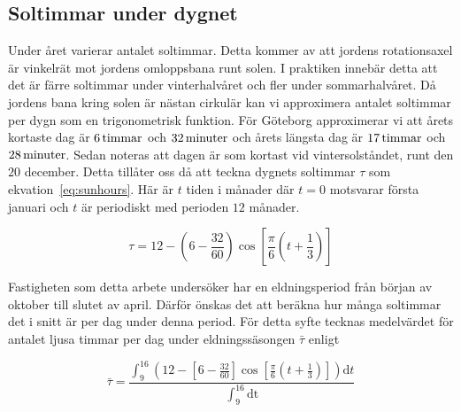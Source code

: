 \subsection{Soltimmar under dygnet}
\label{subsec:sunhours}
Under året varierar antalet soltimmar. Detta kommer av att jordens rotationsaxel är vinkelrät 
mot jordens omloppsbana runt solen. I praktiken innebär detta att det är färre soltimmar
under vinterhalvåret och fler under sommarhalvåret. Då jordens bana kring solen är nästan
cirkulär kan vi approximera antalet soltimmar per dygn som en trigonometrisk funktion.
För Göteborg approximerar vi att årets kortaste dag är $\unit[6]{ timmar}$ och $\unit[32]{minuter}$ och årets längsta
dag är $\unit[17]{ timmar}$ och $\unit[28]{ minuter}$\cite{sunup}. Sedan noteras att dagen är som kortast vid vintersolståndet, runt den $20$
december.
Detta tillåter oss då att teckna dygnets soltimmar $\tau$ som ekvation~\eqref{eq:sunhours}. Här
är $t$ tiden i månader där $t=0$ motsvarar första januari och $t$ är periodiskt med perioden $12$ månader.

\begin{equation}
\label{eq:sunhours}
\tau = 12 - \left(6-\frac{32}{60}\right)\cos\left[\frac{\pi}{6}\left(t+\frac{1}{3}\right)\right]
\end{equation}

Fastigheten som detta arbete undersöker har en eldningsperiod från början av oktober till slutet av april. Därför önskas det att beräkna hur många soltimmar det i snitt är per dag under denna period. För detta syfte tecknas medelvärdet för antalet ljusa timmar per dag under eldningssäsongen $\bar{\tau}$ enligt

\begin{equation}
\label{eq:taubar}
\bar{\tau}= \frac{ \int^{16}_9 \left(12 - \left[6-\frac{32}{60}\right]\cos\left[\frac{\pi}{6}\left(t+
\frac{1}{3}\right)\right]\right)\mathrm{d}t}{\int^{16}_9 \mathrm{dt}}
\end{equation}

